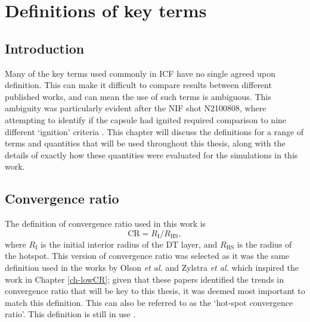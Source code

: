 

\chapter{Definitions of key terms} \label{ch:definitions}

\minitoc

\section{Introduction}

Many of the key terms used commonly in ICF have no single agreed upon definition. This can make it difficult to compare results between different published works, and can mean the use of such terms is ambiguous. This ambiguity was particularly evident after the NIF shot N2100808, where attempting to identify if the capsule had ignited required comparison to nine different `ignition' criteria \cite{Abu-Shawareb2022}. This chapter will discuss the definitions for a range of terms and quantities that will be used throughout this thesis, along with the details of exactly how these quantities were evaluated for the simulations in this work.


\section{Convergence ratio}
The definition of convergence ratio used in this work is 
\begin{equation} \mathrm{CR} =  R_\mathrm{I}/R_\mathrm{HS}, \label{CR} \end{equation} 
where $R_\mathrm{I}$ is the initial interior radius of the DT layer, and $R_\mathrm{HS}$ is the radius of the hotspot. This version of convergence ratio was selected as it was the same definition used in the works by Olson \textit{et al.} \cite{Olson2016} and Zylstra \textit{et al.} \cite{Zylstra2018} which inspired the work in Chapter \ref{ch-lowCR}; given that these papers identified the trends in convergence ratio that will be key to this thesis, it was deemed most important to match this definition. This can also be referred to as the `hot-spot convergence ratio'. This definition is still in use \cite{Olson2021}.


